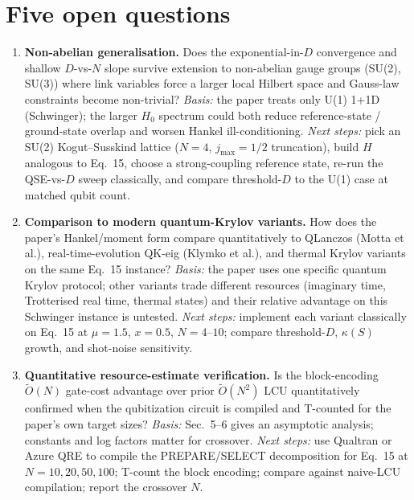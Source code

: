 \section{Five open questions}

\begin{enumerate}
  \item \textbf{Non-abelian generalisation.}  Does the exponential-in-$D$ convergence
    and shallow $D$-vs-$N$ slope survive extension to non-abelian gauge groups
    (SU(2), SU(3)) where link variables force a larger local Hilbert space and
    Gauss-law constraints become non-trivial?  \emph{Basis:} the paper treats
    only U(1) 1+1D (Schwinger); the larger $H_0$ spectrum could both reduce
    reference-state / ground-state overlap and worsen Hankel ill-conditioning.
    \emph{Next steps:} pick an SU(2) Kogut--Susskind lattice ($N=4$, $j_{\max}=1/2$
    truncation), build $H$ analogous to Eq.~15, choose a strong-coupling reference
    state, re-run the QSE-vs-$D$ sweep classically, and compare threshold-$D$ to
    the U(1) case at matched qubit count.

  \item \textbf{Comparison to modern quantum-Krylov variants.}  How does the paper's
    Hankel/moment form compare quantitatively to QLanczos (Motta et al.),
    real-time-evolution QK-eig (Klymko et al.), and thermal Krylov variants on
    the same Eq.~15 instance?  \emph{Basis:} the paper uses one specific quantum
    Krylov protocol; other variants trade different resources (imaginary time,
    Trotterised real time, thermal states) and their relative advantage on this
    Schwinger instance is untested.  \emph{Next steps:} implement each variant
    classically on Eq.~15 at $\mu = 1.5$, $x = 0.5$, $N = 4$--$10$; compare
    threshold-$D$, $\kappa(S)$ growth, and shot-noise sensitivity.

  \item \textbf{Quantitative resource-estimate verification.}  Is the block-encoding
    $\tilde O(N)$ gate-cost advantage over prior $\tilde O(N^2)$ LCU quantitatively
    confirmed when the qubitization circuit is compiled and T-counted for the
    paper's own target sizes?  \emph{Basis:} Sec.~5--6 gives an asymptotic
    analysis; constants and log factors matter for crossover.  \emph{Next steps:}
    use Qualtran or Azure QRE to compile the PREPARE/SELECT decomposition for
    Eq.~15 at $N = 10, 20, 50, 100$; T-count the block encoding; compare against
    naive-LCU compilation; report the crossover $N$.


\end{enumerate}
